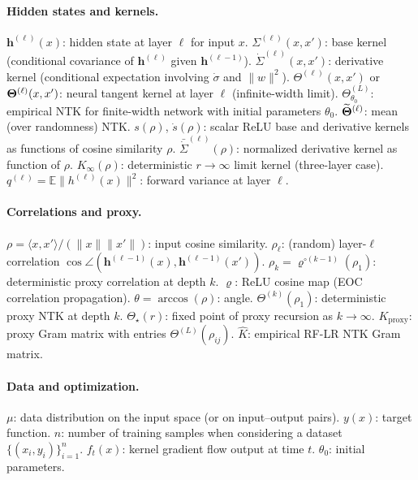 \paragraph{Hidden states and kernels.}
\(\bm{h}^{(\ell)}(x)\): hidden state at layer \(\ell\) for input \(x\). \quad \(\Sigma^{(\ell)}(x,x')\): base kernel (conditional covariance of \(\bm{h}^{(\ell)}\) given \(\bm{h}^{(\ell-1)}\)). \quad \(\dot{\Sigma}^{(\ell)}(x,x')\): derivative kernel (conditional expectation involving \(\dot{\sigma}\) and \(\|w\|^2\)). \quad \(\Theta^{(\ell)}(x,x')\) or \(\boldsymbol{\Theta}^{(\ell)}(x,x')\): neural tangent kernel at layer \(\ell\) (infinite-width limit). \quad \(\Theta^{(L)}_{\theta_0}\): empirical NTK for finite-width network with initial parameters \(\theta_0\). \quad \(\widetilde{\boldsymbol{\Theta}}^{(\ell)}\): mean (over randomness) NTK. \quad \(s(\rho)\), \(\dot{s}(\rho)\): scalar ReLU base and derivative kernels as functions of cosine similarity \(\rho\). \quad \(\bar{\dot{\Sigma}}^{(\ell)}(\rho)\): normalized derivative kernel as function of \(\rho\). \quad \(K_\infty(\rho)\): deterministic \(r\to\infty\) limit kernel (three-layer case). \quad \(q^{(\ell)}=\mathbb{E}\|h^{(\ell)}(x)\|^2\): forward variance at layer \(\ell\).

\paragraph{Correlations and proxy.}
\(\rho=\langle x,x'\rangle/(\|x\|\|x'\|)\): input cosine similarity. \quad \(\rho_\ell\): (random) layer-\(\ell\) correlation \(\cos\angle(\bm{h}^{(\ell-1)}(x),\bm{h}^{(\ell-1)}(x'))\). \quad \(\rho_k=\varrho^{\circ(k-1)}(\rho_1)\): deterministic proxy correlation at depth \(k\). \quad \(\varrho\): ReLU cosine map (EOC correlation propagation). \quad \(\theta=\arccos(\rho)\): angle. \quad \(\Theta^{(k)}(\rho_1)\): deterministic proxy NTK at depth \(k\). \quad \(\Theta_\star(r)\): fixed point of proxy recursion as \(k\to\infty\). \quad \(K_{\mathrm{proxy}}\): proxy Gram matrix with entries \(\Theta^{(L)}(\rho_{ij})\). \quad \(\hat{K}\): empirical RF-LR NTK Gram matrix.

\paragraph{Data and optimization.}
\(\mu\): data distribution on the input space (or on input--output pairs). \quad \(y(x)\): target function. \quad \(n\): number of training samples when considering a dataset \(\{(x_i,y_i)\}_{i=1}^n\). \quad \(f_t(x)\): kernel gradient flow output at time \(t\). \quad \(\theta_0\): initial parameters.

